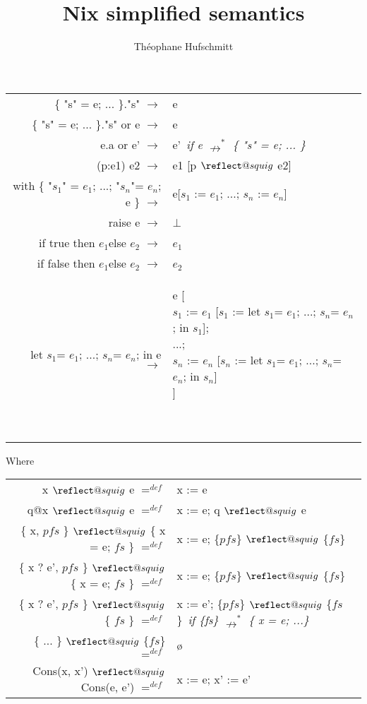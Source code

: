 \documentclass{article}
\title{Nix simplified semantics}
\author{Théophane Hufschmitt}
\date{}
\makeatletter
\providecommand{\leftsquigarrow}{%
  \mathrel{\mathpalette\reflect@squig\relax}%
}
\newcommand{\reflect@squig}[2]{%
  \reflectbox{$\m@th#1\rightsquigarrow$}%
}
\newcommand{\assign}[2]{#1 := #2}
\newcommand{\assignp} [2] {#1 \ensuremath{\leftsquigarrow} #2}
\newcommand{\subst} [3] {#3 [\assign{#1}{#2}]}
\newcommand{\substp} [3] {#3 [\assignp{#1}{#2}]}
\newcommand{\dstep} [2] {#1 \ensuremath{\rightarrow} #2}
\newcommand{\ndsteps} [2] {#1 \ensuremath{\nrightarrow^*} #2}
\newcommand{\dstepa} [3] {\dstep{#1}{&#2}~\emph{#3} \\}
\newcommand{\eqdef}[2]{#1 \ensuremath{=^{def}} #2}
\newcommand{\eqdefa}[3]{\eqdef{#1}{&#2} \emph{#3} \\}
\newcommand{\sone}{\ensuremath{s_1}}
\newcommand{\sn}{\ensuremath{s_n}}
\newcommand{\eone}{\ensuremath{e_1}}
\newcommand{\etwo}{\ensuremath{e_2}}
\newcommand{\en}{\ensuremath{e_n}}
\makeatother
\begin{document}
\maketitle{}

\begin{tabular}{rl}
  \dstepa{\{ "s" = e; ... \}."s"}{e}{}
  \dstepa{\{ "s" = e; ... \}."s" or e}{e}{}
  \dstepa{e.a or e'}{e'}{if \ndsteps{e}{\{ "s" = e; ... \}}}
  \dstepa{(p:e1) e2}{\substp{p}{e2}{e1}}{}
  \dstepa{with \{ "\sone" = \eone; ...; "\sn"= \en; e \}}{%
    e[\assign{\sone}{\eone}; ...; \assign{\sn}{\en}]
  }{}
  \dstepa{raise e}{$\bot$}{}
  \dstepa{if true then \eone else \etwo}{\eone}{}
  \dstepa{if false then \eone else \etwo}{\etwo}{}
  \dstepa{let \sone = \eone; ...; \sn = \en; in e}{%
    \parbox[t]{10cm}{e [ \\
      \assign{\sone}{\subst{\sone}{let \sone = \eone; ...; \sn = \en; in \sone}{\eone}}; \\
      ...; \\
      \assign{\sn}{\subst{\sn}{let \sone = \eone; ...; \sn = \en; in \sn}{\en}} \\
    ]}
  }{}
\end{tabular}

Where

\begin{tabular}{rl}
  \eqdefa{\assignp{x}{e}}{\assign{x}{e}}{}
  \eqdefa{\assignp{q@x}{e}}{\assign{x}{e}; \assignp{q}{e}}{}
  \eqdefa{\assignp{\{ x, $pfs$ \}}{\{ x = e; $fs$ \}}}{%
    \assign{x}{e}; \assignp{\{$pfs$\}}{\{$fs$\}}}{}
  \eqdefa{\assignp{\{ x ? e', $pfs$ \}}{\{ x = e; $fs$ \}}}{%
    \assign{x}{e}; \assignp{\{$pfs$\}}{\{$fs$\}}}{}
  \eqdefa{\assignp{\{ x ? e', $pfs$ \}}{\{ $fs$ \}}}{%
    \assign{x}{e'}; \assignp{\{$pfs$\}}{\{$fs$\}}}{if \ndsteps{\{fs\}}{\{ x = e; ...\}}}
  \eqdefa{\assignp{\{ ... \}}{\{$fs$\}}}{ø}{}
  \eqdefa{\assignp{Cons(x, x')}{Cons(e, e')}}{\assign{x}{e}; \assign{x'}{e'}}{}
\end{tabular}
\end{document}
